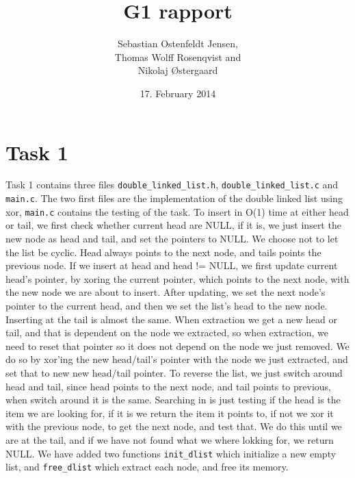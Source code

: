 \documentclass[11pt]{article}
\begin{document}
\title{G1 rapport}
\author{Sebastian Ostenfeldt Jensen,\\ Thomas Wolff Rosenqvist and\\ Nikolaj Østergaard}
\date{17. February 2014}
\maketitle
\thispagestyle{empty}
\pagebreak
{}
\setcounter{page}{1}

\section{Task 1}
Task 1 contains three files \verb|double_linked_list.h|, \verb|double_linked_list.c| and \verb|main.c|. The two first files are the implementation of the double linked list using xor, \verb|main.c| contains the testing of the task. To insert in O(1) time at either head or tail, we first check whether current head are NULL, if it is, we just insert the new node as head and tail, and set the pointers to NULL. We choose not to let the list be cyclic. Head always points to the next node, and tails points the previous node. If we insert at head and head != NULL, we first update current head's pointer, by xoring the current pointer, which points to the next node, with the new node we are about to insert. After updating, we set the next node's pointer to the current head, and then we set the list's head to the new node. Inserting at the tail is almost the same.
\newline
When extraction we get a new head or tail, and that is dependent on the node we extracted, so when extraction, we need to reset that pointer so it does not depend on the node we just removed. We do so by xor'ing the new head/tail's pointer with the node we just extracted, and set that to new new head/tail pointer.
\newline
To reverse the list, we just switch around head and tail, since head points to the next node, and tail points to previous, when switch around it is the same.
\newline
Searching in is just testing if the head is the item we are looking for, if it is we return the item it points to, if not we xor it with the previous node, to get the next node, and test that. We do this until we are at the tail, and if we have not found what we where lokking for, we return NULL.
\newline
We have added two functions \verb|init_dlist| which initialize a new empty list, and \verb|free_dlist| which extract each node, and free its memory.
\end{document}
